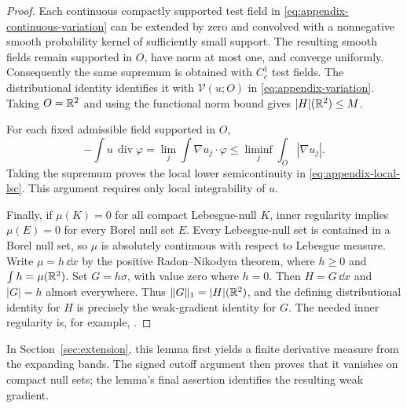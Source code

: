\begin{proof}
Each continuous compactly supported test field in
\eqref{eq:appendix-continuous-variation} can be extended by zero
and convolved with a nonnegative smooth probability kernel of
sufficiently small support. The resulting smooth fields remain
supported in $O$, have norm at most one, and converge uniformly.
Consequently the same supremum is obtained with $C_c^1$ test
fields. The distributional identity identifies it with
$\mathcal V(u;O)$ in \eqref{eq:appendix-variation}. Taking
$O=\mathbb R^2$ and using the functional norm bound gives
$|H|(\mathbb R^2)\le M$.

For each fixed admissible field supported in $O$,
\[
 -\int u\,\operatorname{div}\varphi
 =\lim_j\int\nabla u_j\cdot\varphi
 \le\liminf_j\int_O|\nabla u_j|.
\]
Taking the supremum proves the local lower semicontinuity in
\eqref{eq:appendix-local-lsc}. This argument requires only local
integrability of $u$.

Finally, if $\mu(K)=0$ for all compact Lebesgue-null $K$, inner
regularity implies $\mu(E)=0$ for every Borel null set $E$.
Every Lebesgue-null set is contained in a Borel null set, so
$\mu$ is absolutely continuous with respect to Lebesgue measure.
Write $\mu=h\,\dd x$ by the positive Radon--Nikodym theorem,
where $h\ge0$ and $\int h=\mu(\mathbb R^2)$. Set $G=h\sigma$,
with value zero where $h=0$. Then $H=G\,\dd x$ and
$|G|=h$ almost everywhere. Thus
$\|G\|_1=|H|(\mathbb R^2)$, and the defining distributional identity
for $H$ is precisely the weak-gradient identity for $G$.
The needed inner regularity is, for example,
\cite[Chapter~1, Lemma~5.7]{Simon2018}.
\end{proof}

In Section~\ref{sec:extension}, this lemma first yields a finite
derivative measure from the expanding bands. The signed cutoff
argument then proves that it vanishes on compact null sets;
the lemma's final assertion identifies the resulting weak gradient.
